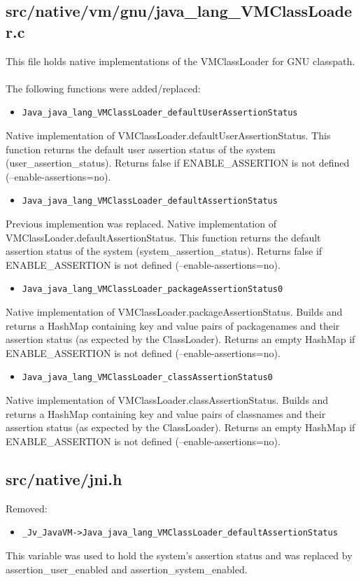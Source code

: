 \documentclass{article}%
\begin{document}
\subsection{src/native/vm/gnu/java\_lang\_VMClassLoader.c}
\label{see2}
This file holds native implementations of the VMClassLoader for GNU classpath.
\\\\
The following functions were added/replaced:
\begin{itemize}
\item{\verb'Java_java_lang_VMClassLoader_defaultUserAssertionStatus'}
\end{itemize}
\noindent Native implementation of VMClassLoader.defaultUserAssertionStatus. This function returns the default user assertion status of the system (user\_assertion\_status). Returns false if ENABLE\_ASSERTION is not defined (--enable-assertions=no).
\begin{itemize}
\item{\verb'Java_java_lang_VMClassLoader_defaultAssertionStatus'}
\end{itemize}
\noindent Previous implemention was replaced. Native implementation of VMClassLoader.defaultAssertionStatus. This function returns the default assertion status of the system (system\_assertion\_status). Returns false if ENABLE\_ASSERTION is not defined (--enable-assertions=no).
\begin{itemize}
\item{\verb'Java_java_lang_VMClassLoader_packageAssertionStatus0'}
\end{itemize}
\noindent Native implementation of VMClassLoader.packageAssertionStatus. Builds and returns a HashMap containing key and value pairs of packagenames and their assertion status (as expected by the ClassLoader). Returns an empty HashMap if ENABLE\_ASSERTION is not defined (--enable-assertions=no).
\begin{itemize}
\item{\verb'Java_java_lang_VMClassLoader_classAssertionStatus0'}
\end{itemize}
\noindent Native implementation of VMClassLoader.classAssertionStatus. Builds and returns a HashMap containing key and value pairs of classnames and their assertion status (as expected by the ClassLoader). Returns an empty HashMap if ENABLE\_ASSERTION is not defined (--enable-assertions=no).

\subsection{src/native/jni.h}
Removed:
\begin{itemize}
\item{\verb'_Jv_JavaVM->Java_java_lang_VMClassLoader_defaultAssertionStatus'}
\end{itemize}
\noindent This variable was used to hold the system's assertion status and was replaced by assertion\_user\_enabled and assertion\_system\_enabled.
\end{document}
